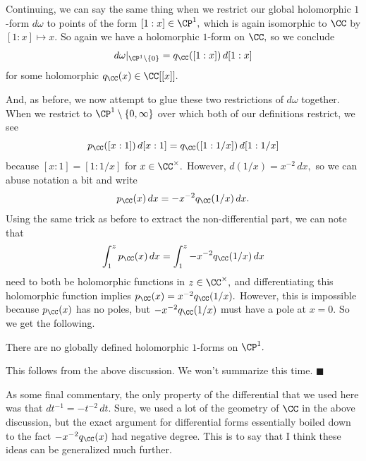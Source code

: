 Continuing, we can say the same thing when we restrict our global holomorphic $1$-form $d\omega$ to points of the form $[1:x]\in\CP^1,$ which is again isomorphic to $\CC$ by $[1:x]\mapsto x.$ So again we have a holomorphic $1$-form on $\CC,$ so we conclude
\[d\omega|_{\CP^1\setminus\{0\}}=q_\CC([1:x])\,d[1:x]\]
for some holomorphic $q_\CC(x)\in\CC[[x]].$

And, as before, we now attempt to glue these two restrictions of $d\omega$ together. When we restrict to $\CP^1\setminus\{0,\infty\}$ over which both of our definitions restrict, we see
\[p_\CC([x:1])\,d[x:1]=q_\CC([1:1/x])\,d[1:1/x]\]
because $[x:1]=[1:1/x]$ for $x\in\CC^\times.$ However, $d(1/x)=x^{-2}\,dx,$ so we can abuse notation a bit and write
\[p_\CC(x)\,dx=-x^{-2}q_\CC(1/x)\,dx.\]
Using the same trick as before to extract the non-differential part, we can note that
\[\int_1^zp_\CC(x)\,dx=\int_1^z-x^{-2}q_\CC(1/x)\,dx\]
need to both be holomorphic functions in $z\in\CC^\times,$ and differentiating this holomorphic function implies $p_\CC(x)=x^{-2}q_\CC(1/x).$ However, this is impossible because $p_\CC(x)$ has no poles, but $-x^{-2}q_\CC(1/x)$ must have a pole at $x=0.$ So we get the following.
\begin{proposition}
    There are no globally defined holomorphic $1$-forms on $\CP^1.$
\end{proposition}
This follows from the above discussion. We won't summarize this time. $\blacksquare$

As some final commentary, the only property of the differential that we used here was that $dt^{-1}=-t^{-2}\,dt.$ Sure, we used a lot of the geometry of $\CC$ in the above discussion, but the exact argument for differential forms essentially boiled down to the fact $-x^{-2}q_\CC(x)$ had negative degree. This is to say that I think these ideas can be generalized much further.

